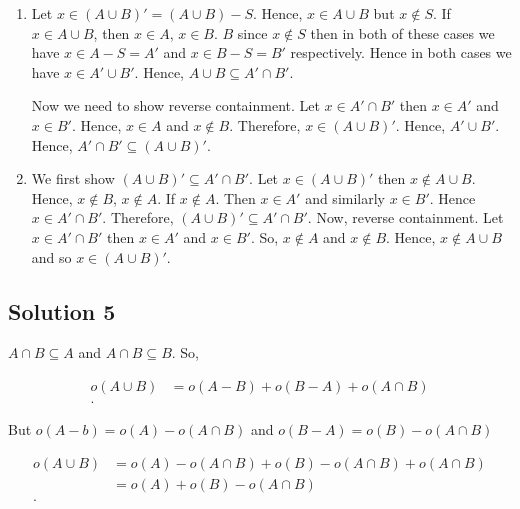 \begin{enumerate}

  \item  Let \( x \in  \left( A \cup B \right)' = \left( A \cup B \right) - S\). Hence, \( x \in A \cup B \)
but \( x \notin S \). If \( x \in A \cup B \), then \( x \in A \), \( x \in B \). 
\( B \) since \( x \notin S \) then in both of these cases we have \( x \in A - S = A'\) 
and \( x \in  B - S = B' \) respectively. Hence in both cases we have \( x \in A' \cup B' \).
Hence, \( A \cup B \subseteq A' \cap B' \).

Now we need to show reverse containment. Let \( x \in A' \cap B' \) then \( x \in A' \) and \( x \in  B' \). Hence, 
\(  x \in A \) and \( x \notin B \). Therefore, \( x \in  \left( A \cup B \right)' \). Hence, \( A' \cup B'  \).
Hence, \( A' \cap B' \subseteq \left( A \cup B \right)' \).

\item We first show \( \left( A \cup B \right)' \subseteq A ' \cap B'\). Let \( x \in  \left( A \cup B \right)' \) then
  \( x \notin A \cup B \). Hence, \( x \notin B \), \( x \notin A \). If \( x \notin A \). Then
  \( x \in A' \) and similarly \( x \in B' \). Hence \( x \in  A' \cap  B' \). 
  Therefore, \( \left( A \cup B \right)' \subseteq A' \cap B' \). Now, reverse containment. Let \( x \in  A' \cap B' \) then \( x \in  A' \) and \( x \in  B' \). So, \( x \notin A \)
  and \( x \notin B \). Hence, \( x \notin A \cup B \) and so \( x \in  \left( A \cup B \right)'  \).
\end{enumerate}

\subsection{Solution 5}

\( A \cap B \subseteq A \) and \( A \cap B \subseteq B\). So,

\begin{align*}
  o \left( A \cup B \right) &= o \left(A - B  \right) + o \left( B-A \right) + o \left( A \cap B \right)\\
.\end{align*}

But \( o \left( A-b \right) = o(A) - o \left( A \cap B \right) \) and
\( o \left( B - A \right) = o \left( B \right) - o \left( A \cap B \right)\)

\begin{align*}
  o \left( A \cup B \right) &= o \left( A \right) - o \left( A \cap B \right) + o \left( B \right) - o \left( A \cap B \right) + o \left( A \cap B \right)\\
  &= o \left( A \right) + o \left( B \right) - o \left( A \cap B \right) \\
.\end{align*}

